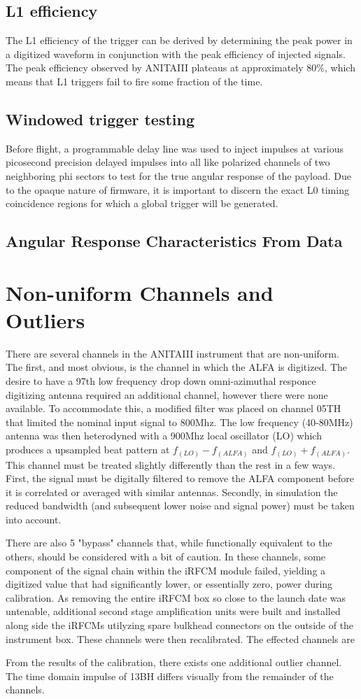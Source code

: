 	\subsection{L1 efficiency}
		The L1 efficiency of the trigger can be derived by determining the peak power in a digitized waveform in conjunction with the peak efficiency of injected signals.  The peak efficiency observed by ANITAIII plateaus at approximately 80\%, which means that L1 triggers fail to fire some fraction of the time.
	\subsection{Windowed trigger testing}
		Before flight, a programmable delay line was used to inject impulses at various picosecond precision delayed impulses into all like polarized channels of two neighboring phi sectors to test for the true angular response of the payload.  Due to the opaque nature of firmware, it is important to discern the exact L0 timing coincidence regions for which a global trigger will be generated.
	\subsection{Angular Response Characteristics From Data}
		



\section{Non-uniform Channels and Outliers}
	There are several channels in the ANITAIII instrument that are non-uniform.  The first, and most obvious, is the channel in which the ALFA is digitized.  The desire to have a 97th low frequency drop down omni-azimuthal responce digitizing antenna required an additional channel, however there were none available.  To accommodate this, a modified filter was placed on channel 05TH that limited the nominal input signal to 800Mhz.  The low frequency (40-80MHz) antenna was then heterodyned with a 900Mhz local oscillator (LO) which produces a upsampled beat pattern at $f_(LO)-f_(ALFA)$ and $f_(LO)+f_(ALFA)$. This channel must be treated slightly differently than the rest in a few ways.  First, the signal must be digitally filtered to remove the ALFA component before it is correlated or averaged with similar antennas.  Secondly, in simulation the reduced bandwidth (and subsequent lower noise and signal power) must be taken into account.
	
	There are also 5 "bypass" channels that, while functionally equivalent to the others, should be considered with a bit of caution.  In these channels, some component of the signal chain within the iRFCM module failed, yielding a digitized value that had significantly lower, or essentially zero, power during calibration.  As removing the entire iRFCM box so close to the launch date was untenable, additional second stage amplification units were built and installed along side the iRFCMs utilyzing spare bulkhead connectors on the outside of the instrument box.  These channels were then recalibrated.  The effected channels are 

	From the results of the calibration, there exists one additional outlier channel.  The time domain impulse of 13BH differs visually from the remainder of the channels.  

